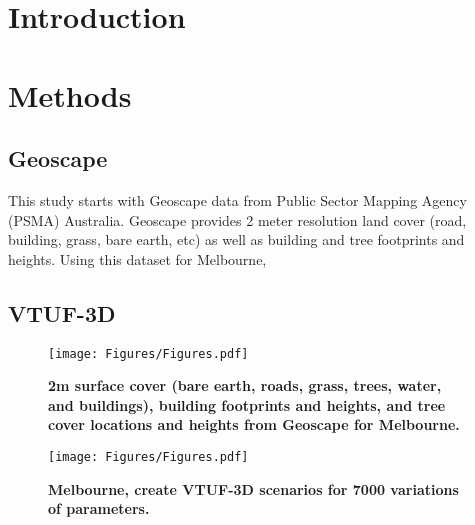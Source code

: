 \documentclass[final,3p,times,authoryear]{elsarticle}
\begin{document}
\maketitle

\section{Introduction}

\section{Methods}

\subsection{Geoscape}
This study starts with Geoscape\citep{Geoscape2020} data from Public Sector Mapping Agency (PSMA) Australia. Geoscape provides 2 meter resolution land cover (road, building, grass, bare earth, etc) as well as building and tree footprints and heights. Using this dataset for Melbourne, 



\subsection{VTUF-3D}


\begin{figure*}
\centering
\texttt{[image: Figures/Figures.pdf]}
\caption{\bf 2m surface cover (bare earth, roads, grass, trees, water, and buildings), building footprints and heights, and tree cover locations and heights from Geoscape for Melbourne.}
 \label{fig:geoscape}
\end{figure*} 



\begin{figure*}
\centering
\texttt{[image: Figures/Figures.pdf]}
\caption{\bf Melbourne, create VTUF-3D scenarios for 7000 variations of parameters.}
 \label{fig:scenarios}
\end{figure*} 
\end{document}
